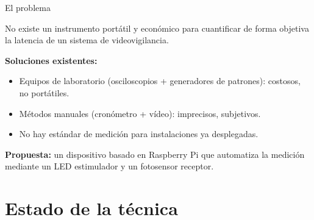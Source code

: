 \documentclass[aspectratio=169,11pt]{beamer}
\begin{document}
\begin{frame}{El problema}

\begin{alertblock}{No existe un instrumento portátil y económico}
para cuantificar de forma objetiva la latencia de un sistema de videovigilancia.
\end{alertblock}

\vspace{0.5cm}

\textbf{Soluciones existentes:}
\begin{itemize}
    \item Equipos de laboratorio (osciloscopios + generadores de patrones): costosos, no portátiles.
    \item Métodos manuales (cronómetro + vídeo): imprecisos, subjetivos.
    \item No hay estándar de medición para instalaciones ya desplegadas.
\end{itemize}

\vspace{0.3cm}
\textbf{Propuesta:} un dispositivo basado en Raspberry Pi que automatiza la medición mediante un LED estimulador y un fotosensor receptor.

\end{frame}

\section{Estado de la técnica}
\end{document}
